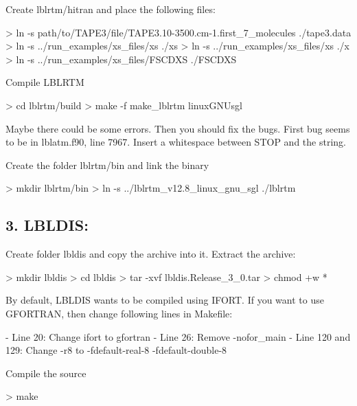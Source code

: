 \begin{DoxyItemize}
\item Create lblrtm/hitran and place the following files\+: 
\begin{DoxyCode}
> ln -s path/to/TAPE3/file/TAPE3.10-3500.cm-1.first\_7\_molecules ./tape3.data
> ln -s ../run\_examples/xs\_files/xs ./xs
> ln -s ../run\_examples/xs\_files/xs ./x
> ln -s ../run\_examples/xs\_files/FSCDXS ./FSCDXS
\end{DoxyCode}

\item Compile L\+B\+L\+R\+TM 
\begin{DoxyCode}
> cd lblrtm/build
> make -f make\_lblrtm linuxGNUsgl
\end{DoxyCode}
 Maybe there could be some errors. Then you should fix the bugs. First bug seems to be in lblatm.\+f90, line 7967. Insert a whitespace between S\+T\+OP and the string.
\item Create the folder lblrtm/bin and link the binary 
\begin{DoxyCode}
> mkdir lblrtm/bin
> ln -s ../lblrtm\_v12.8\_linux\_gnu\_sgl ./lblrtm
\end{DoxyCode}

\end{DoxyItemize}

\subsection*{3. L\+B\+L\+D\+IS\+:}


\begin{DoxyItemize}
\item Create folder lbldis and copy the archive into it. Extract the archive\+: 
\begin{DoxyCode}
> mkdir lbldis
> cd lbldis
> tar -xvf lbldis.Release\_3\_0.tar 
> chmod +w *
\end{DoxyCode}

\item By default, L\+B\+L\+D\+IS wants to be compiled using I\+F\+O\+RT. If you want to use G\+F\+O\+R\+T\+R\+AN, then change following lines in Makefile\+: 
\begin{DoxyCode}
- Line 20: Change ifort to gfortran
- Line 26: Remove -nofor\_main
- Line 120 and 129: Change -r8 to -fdefault-real-8 -fdefault-double-8
\end{DoxyCode}

\item Compile the source 
\begin{DoxyCode}
> make
\end{DoxyCode}

\end{DoxyItemize}

